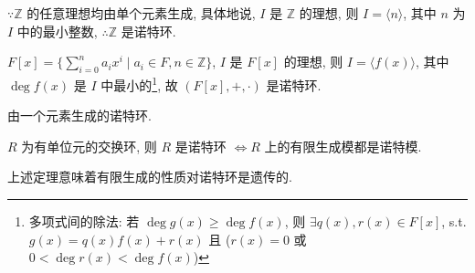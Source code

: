 \documentclass{note}
\begin{document}
\begin{eg}
    $\because\mathbb{Z}$ 的任意理想均由单个元素生成, 具体地说, $I$ 是 $\mathbb{Z}$ 的理想, 则 $I=\langle n\rangle$, 其中 $n$ 为 $I$ 中的最小整数, $\therefore\mathbb{Z}$ 是诺特环.
\end{eg}

\begin{eg}
    $F[x]=\{\sum_{i=0}^na_ix^i\mid a_i\in F,n\in\mathbb{Z}\}$, $I$ 是 $F[x]$ 的理想, 则 $I=\langle f(x)\rangle$, 其中 $\deg f(x)$ 是 $I$ 中最小的\footnote{多项式间的除法: 若 $\deg g(x)\geq\deg f(x)$, 则 $\exists q(x),r(x)\in F[x]$, s.t. $g(x)=q(x)f(x)+r(x)$ 且 ($r(x)=0$ 或 $0<\deg r(x)<\deg f(x)$)}, 故 $(F[x],+,\cdot)$ 是诺特环.
\end{eg}

\begin{df}[主理想]
    由一个元素生成的诺特环.
\end{df}

\begin{thm}[(课本定理 5.8)]\label{thm-5.8}
    $R$ 为有单位元的交换环, 则 $R$ 是诺特环 $\Longleftrightarrow R$ 上的有限生成模都是诺特模.
\end{thm}

上述定理意味着有限生成的性质对诺特环是遗传的.
\end{document}

